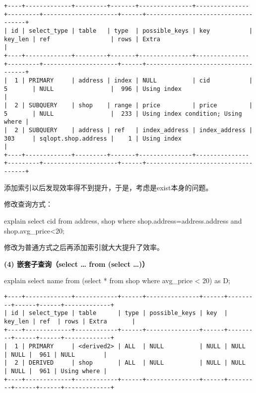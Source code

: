 \documentclass[a4paper, 11pt, nofonts, nocap, fancyhdr]{ctexart}
\begin{document}
\begin{verbatim}
+----+-------------+---------+-------+---------------+---------------+---------+---------------------+------+------------------------------------+
| id | select_type | table   | type  | possible_keys | key           | key_len | ref                 | rows | Extra                              |
+----+-------------+---------+-------+---------------+---------------+---------+---------------------+------+------------------------------------+
|  1 | PRIMARY     | address | index | NULL          | cid           | 5       | NULL                |  996 | Using index                        |
|  2 | SUBQUERY    | shop    | range | price         | price         | 5       | NULL                |  233 | Using index condition; Using where |
|  2 | SUBQUERY    | address | ref   | index_address | index_address | 303     | sqlopt.shop.address |    1 | Using index                        |
+----+-------------+---------+-------+---------------+---------------+---------+---------------------+------+------------------------------------+
\end{verbatim}

添加索引以后发现效率得不到提升，于是，考虑是exist本身的问题。

修改查询方式：

explain select cid from address, shop where shop.address=address.address and shop.avg\_price<20;

修改为普通方式之后再添加索引就大大提升了效率。

\vspace{0.7cm}

\textbf{(4) 嵌套子查询（select … from (select …)）} 

explain select name from (select * from shop where avg\_price < 20) as D;

\begin{verbatim}
+----+-------------+------------+------+---------------+------+---------+------+------+-------------+
| id | select_type | table      | type | possible_keys | key  | key_len | ref  | rows | Extra       |
+----+-------------+------------+------+---------------+------+---------+------+------+-------------+
|  1 | PRIMARY     | <derived2> | ALL  | NULL          | NULL | NULL    | NULL |  961 | NULL        |
|  2 | DERIVED     | shop       | ALL  | NULL          | NULL | NULL    | NULL |  961 | Using where |
+----+-------------+------------+------+---------------+------+---------+------+------+-------------+
\end{verbatim}
\end{document}

